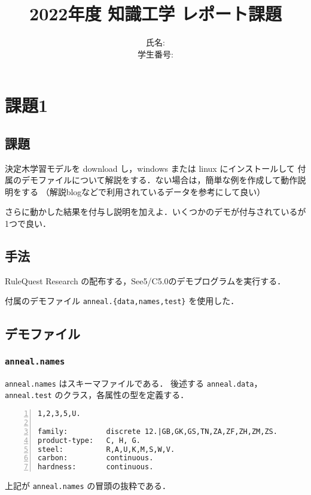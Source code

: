 \documentclass[a4paper, lualatex, ja=standard]{bxjsarticle}
\title{2022年度 知識工学 レポート課題}
\author{氏名:  \\ 学生番号: }
\begin{document}
\maketitle

\section{課題1}

\subsection{課題}

決定木学習モデルを download し，windows または linux にインストールして
付属のデモファイルについて解説をする．ない場合は，簡単な例を作成して動作説明をする
（解説blogなどで利用されているデータを参考にして良い）

さらに動かした結果を付与し説明を加えよ．いくつかのデモが付与されているが1つで良い．

\subsection{手法}

RuleQuest Research\cite{rulequest} の配布する，See5/C5.0のデモプログラムを実行する．

付属のデモファイル \verb|anneal.{data,names,test}| を使用した．

\subsection{デモファイル}

\subsubsection{\texttt{anneal.names}}

\verb|anneal.names| はスキーマファイルである．
後述する \verb|anneal.data|，\verb|anneal.test| のクラス，各属性の型を定義する．

\begin{Verbatim}[frame=single, label=anneal.names, numbers=left, fontsize=\small]
1,2,3,5,U.

family:         discrete 12.|GB,GK,GS,TN,ZA,ZF,ZH,ZM,ZS.
product-type:   C, H, G.
steel:          R,A,U,K,M,S,W,V.
carbon:         continuous.
hardness:       continuous.
\end{Verbatim}

上記が \verb|anneal.names| の冒頭の抜粋である．
\end{document}
